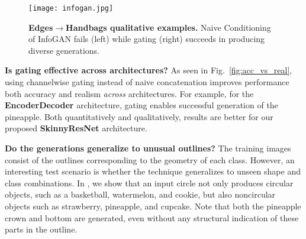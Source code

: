 
\begin{figure}[t]
    \centering
    \texttt{[image: infogan.jpg]}
    \caption{{\bf Edges$\rightarrow$Handbags qualitative examples.} Naive Conditioning of InfoGAN fails (left) while gating (right) succeeds in producing diverse generations.
    \vspace{-5mm}
    }\label{fig:infogan_gate}
    \vspace{-2mm}
\end{figure}

\vspace{2mm} \noindent \textbf{Is gating effective across architectures?} 
As seen in Fig.~\ref{fig:acc_vs_real}, using channelwise gating instead of naive concatenation improves performance both accuracy and realism \textit{across} architectures. For example, for the \textbf{EncoderDecoder} architecture, gating enables successful generation of the pineapple.
Both quantitatively and qualitatively, results are better for our proposed \textbf{SkinnyResNet} architecture.


\vspace{2mm} \noindent \textbf{Do the generations generalize to unusual outlines?} The training images consist of the outlines corresponding to the geometry of each class. However, an interesting test scenario is whether the technique generalizes to unseen shape and class combinations. In , we show that an input circle not only produces circular objects, such as a basketball, watermelon, and cookie, but also noncircular objects such as strawberry, pineapple, and cupcake. Note that both the pineapple crown and bottom are generated, even without any structural indication of these parts in the outline.

